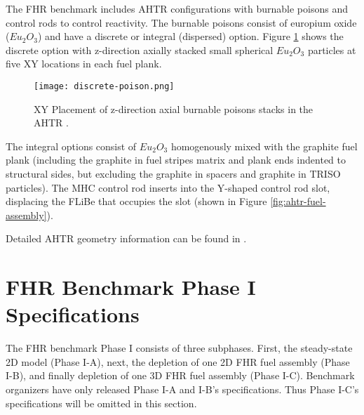 The \gls{FHR} benchmark includes \gls{AHTR} configurations with burnable poisons 
and control rods to control reactivity. 
The burnable poisons consist of europium oxide ($Eu_2O_3$) and have a discrete
or integral (dispersed) option. 
Figure \ref{fig:discrete-poison} shows the discrete option with z-direction axially 
stacked small spherical $Eu_2O_3$ particles at five XY locations in each 
fuel plank. 
\begin{figure}[htbp]
    \centering
    \texttt{[image: discrete-poison.png]}
    \caption{XY Placement of z-direction axial burnable poisons stacks in the \acrlong{AHTR} 
    \cite{noauthor_fluoride_nodate}.}
    \label{fig:discrete-poison}
\end{figure}
The integral options consist of $Eu_2O_3$ homogenously mixed with the graphite 
fuel plank (including the graphite in fuel stripes matrix and plank ends 
indented to structural sides, but excluding the graphite in spacers and 
graphite in TRISO particles).
The \gls{MHC} control rod inserts into the Y-shaped control rod slot, displacing
the \gls{FLiBe} that occupies the slot 
(shown in Figure \ref{fig:ahtr-fuel-assembly}). 

Detailed \gls{AHTR} geometry information can be found in \cite{petrovic_benchmark_2021}.

\section{FHR Benchmark Phase I Specifications}
\label{sec:phase1}
The \gls{FHR} benchmark Phase I consists of three subphases.
First, the steady-state 2D model (Phase I-A), next, the depletion of one 2D \gls{FHR} fuel 
assembly (Phase I-B), and finally depletion of one 3D \gls{FHR} fuel assembly 
(Phase I-C).
Benchmark organizers have only released Phase I-A and I-B's specifications. 
Thus Phase I-C's specifications will be omitted in this section.

